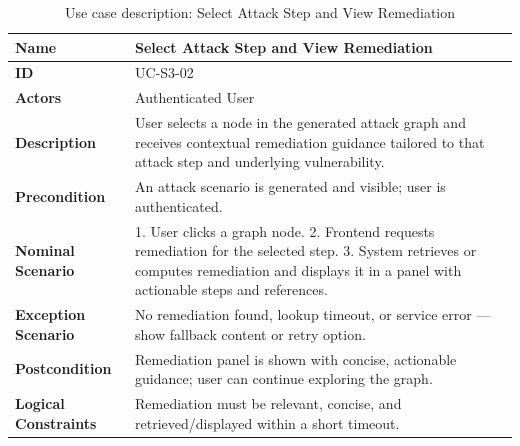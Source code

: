 \begin{table}[H]
  \centering
  \caption{Use case description: Select Attack Step and View Remediation}
  \label{tab:select-step-remediation}
  \renewcommand{\arraystretch}{1.4}
  \small
  \begin{tabularx}{\textwidth}{|p{2.5cm}|X|}
    \hline
    \textbf{Name} & Select Attack Step and View Remediation \\\hline
    \textbf{ID} & UC-S3-02 \\\hline
    \textbf{Actors} & Authenticated User \\\hline
    \textbf{Description} & User selects a node in the generated attack graph and receives contextual remediation guidance tailored to that attack step and underlying vulnerability. \\\hline
    \textbf{Precondition} & An attack scenario is generated and visible; user is authenticated. \\\hline
    \textbf{Nominal Scenario} & 1. User clicks a graph node. 2. Frontend requests remediation for the selected step. 3. System retrieves or computes remediation and displays it in a panel with actionable steps and references. \\\hline
    \textbf{Exception Scenario} & No remediation found, lookup timeout, or service error — show fallback content or retry option. \\\hline
    \textbf{Postcondition} & Remediation panel is shown with concise, actionable guidance; user can continue exploring the graph. \\\hline
    \textbf{Logical Constraints} & Remediation must be relevant, concise, and retrieved/displayed within a short timeout. \\\hline
  \end{tabularx}
\end{table}

